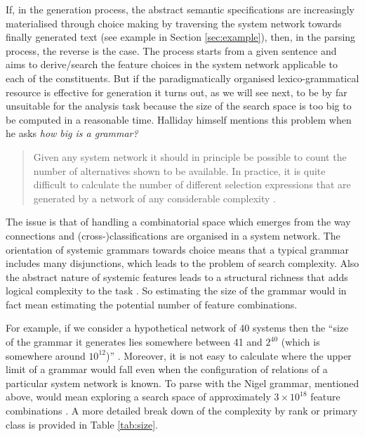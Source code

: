 If, in the generation process, the abstract semantic specifications are increasingly materialised through choice making by traversing the system network towards finally generated text (see example in Section \ref{sec:example}), then, in the parsing process, the reverse is the case. The process starts from a given sentence and aims to derive/search the feature choices in the system network applicable to each of the constituents. But if the paradigmatically organised lexico-grammatical resource is effective for generation it turns out, as we will see next, to be by far unsuitable for the analysis task because the size of the search space is too big to be computed in a reasonable time.
Halliday himself mentions this problem when he asks \textit{how big is a grammar?}

\begin{quote}
    Given any system network it should in principle be possible to count the number of alternatives shown to be available. In practice, it is quite difficult to calculate the number of different selection expressions that are generated by a network of any considerable complexity \citep[10]{Halliday96-grammatics}.
\end{quote}

The issue is that of handling a combinatorial space which emerges from the way connections and (cross-)classifications are organised in a system network. The orientation of systemic grammars towards choice means that a typical grammar includes many disjunctions, which leads to the problem of search complexity. Also the abstract nature of systemic features leads to a structural richness that adds logical complexity to the task \citep{ODonnell1993}. So estimating the size of the grammar would in fact mean estimating the potential number of feature combinations.

For example, if we consider a hypothetical network of 40 systems then the ``size of the grammar it generates lies somewhere between 41 and $2^{40}$ (which is somewhere around $10^{12}$)'' \citep[28]{Bateman2008}. Moreover, it is not easy to calculate where the upper limit of a grammar would fall even when the configuration of relations of a particular system network is known. %
To parse with the Nigel grammar, mentioned above, would mean exploring a search space of approximately $3 \times 10^{18} $ feature combinations \citep[35]{Bateman2008}. A more detailed break down of the complexity by rank or primary class is provided in Table \ref{tab:size}.


